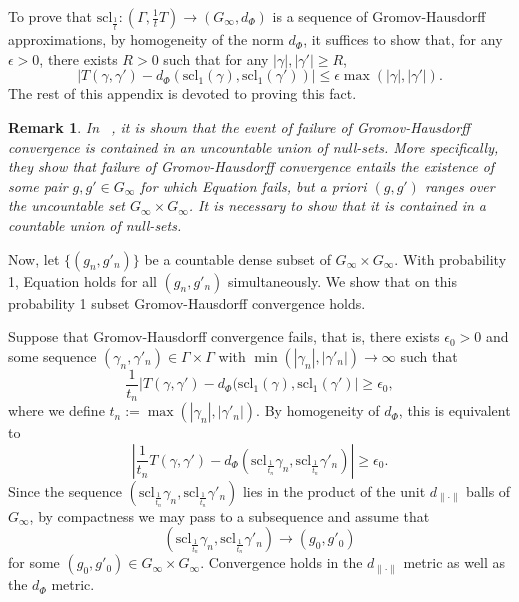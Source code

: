 \documentclass[12pt,reqno]{article}
\makeatletter
\let\reftagform@=\tagform@
\def\tagform@#1{\maketag@@@{(\ignorespaces\textcolor{purple}{#1}\unskip\@@italiccorr)}}
\renewcommand{\eqref}[1]{\textup{\reftagform@{\ref{#1}}}}
\numberwithin{equation}{section}
\newcommand{\scl}{\mathrm{scl}}
\newtheorem{rmk}{Remark}
\makeatother
\begin{document}
To prove that $\scl_{\frac{1}{t}} : (\Gamma, \frac{1}{t} T) \to (G_{\infty}, d_\Phi)$ is a sequence of Gromov-Hausdorff approximations, 
by homogeneity of the norm $d_{\Phi}$, it suffices 
to show that, for any $\epsilon > 0$, there exists $R>0$ such that for any 
$|\gamma|,|\gamma'| \ge R$,
\[
   | T(\gamma, \gamma') - d_{\Phi}(\scl_1(\gamma), \scl_1(\gamma')) | \le \epsilon \max(|\gamma|,|\gamma'|).
\] 
The rest of this appendix is devoted to proving this fact.
\begin{rmk}\label{rem:correction}
In ~\cite{CantrellFurman}, it is shown that the event of failure of Gromov-Hausdorff convergence
is contained in an uncountable union of null-sets. More specifically, they show that failure of Gromov-Hausdorff convergence
entails the existence of some pair $g,g' \in G_{\infty}$ for which Equation \eqref{eq:ptwise} fails, but a priori $(g,g')$ ranges over
the uncountable set $G_{\infty} \times G_{\infty}$.
It is necessary to show that it is contained in a \emph{countable} union of 
null-sets.
\end{rmk}
Now, let $\{(g_n,g'_n)\}$ be a countable dense subset of $G_{\infty} \times G_{\infty}$. With probability 1, Equation \eqref{eq:ptwise}
holds for all $(g_n,g'_n)$ simultaneously. We show that on this probability 1 subset Gromov-Hausdorff convergence holds.

Suppose that Gromov-Hausdorff convergence fails, that is, there exists $\epsilon_0 > 0$ and some sequence 
$(\gamma_n, \gamma'_n) \in \Gamma \times \Gamma$ with $\min(|\gamma_n|, |\gamma'_n|) \to \infty$ such that
\[
   \frac{1}{t_n} | T(\gamma, \gamma') - d_{\Phi}(\scl_1(\gamma), \scl_1(\gamma') | \ge \epsilon_0,
\]
where we define $t_n := \max( |\gamma_n| , |\gamma'_n| )$.
By homogeneity of $d_{\Phi}$, this is equivalent to
\begin{equation} \label{eq:counterexample}
   \left| \frac{1}{ t_n} T(\gamma, \gamma') - 
   d_{\Phi}(\scl_{\frac{1}{t_n}} \gamma_n, \scl_{\frac{1}{t_n}} \gamma'_n) \right|
   \ge \epsilon_0.
\end{equation}
Since the sequence $(\scl_{\frac{1}{t_n}} \gamma_n, \scl_{\frac{1}{t_n}} \gamma'_n)$
lies in the product of the unit $d_{\|\cdot\|}$ balls of $G_{\infty}$, by compactness we may pass to a subsequence and assume that
\[
   (\scl_{\frac{1}{t_n}} \gamma_n, \scl_{\frac{1}{t_n}} \gamma'_n) \to (g_0,g'_0)
\]
for some $(g_0,g'_0) \in G_{\infty} \times G_{\infty}$. Convergence holds in the $d_{\|\cdot\|}$ metric as well as the $d_{\Phi}$ metric.
\end{document}
